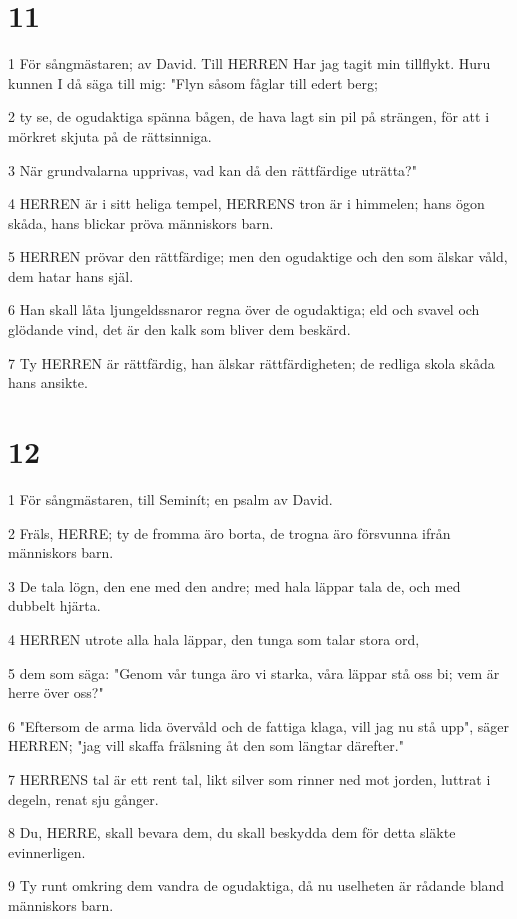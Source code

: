 \chapter{11}

\par 1 För sångmästaren; av David. Till HERREN Har jag tagit min tillflykt. Huru kunnen I då säga till mig: "Flyn såsom fåglar till edert berg;
\par 2 ty se, de ogudaktiga spänna bågen, de hava lagt sin pil på strängen, för att i mörkret skjuta på de rättsinniga.
\par 3 När grundvalarna upprivas, vad kan då den rättfärdige uträtta?"
\par 4 HERREN är i sitt heliga tempel, HERRENS tron är i himmelen; hans ögon skåda, hans blickar pröva människors barn.
\par 5 HERREN prövar den rättfärdige; men den ogudaktige och den som älskar våld, dem hatar hans själ.
\par 6 Han skall låta ljungeldssnaror regna över de ogudaktiga; eld och svavel och glödande vind, det är den kalk som bliver dem beskärd.
\par 7 Ty HERREN är rättfärdig, han älskar rättfärdigheten; de redliga skola skåda hans ansikte.

\chapter{12}

\par 1 För sångmästaren, till Seminít; en psalm av David.
\par 2 Fräls, HERRE; ty de fromma äro borta, de trogna äro försvunna ifrån människors barn.
\par 3 De tala lögn, den ene med den andre; med hala läppar tala de, och med dubbelt hjärta.
\par 4 HERREN utrote alla hala läppar, den tunga som talar stora ord,
\par 5 dem som säga: "Genom vår tunga äro vi starka, våra läppar stå oss bi; vem är herre över oss?"
\par 6 "Eftersom de arma lida övervåld och de fattiga klaga, vill jag nu stå upp", säger HERREN; "jag vill skaffa frälsning åt den som längtar därefter."
\par 7 HERRENS tal är ett rent tal, likt silver som rinner ned mot jorden, luttrat i degeln, renat sju gånger.
\par 8 Du, HERRE, skall bevara dem, du skall beskydda dem för detta släkte evinnerligen.
\par 9 Ty runt omkring dem vandra de ogudaktiga, då nu uselheten är rådande bland människors barn.

